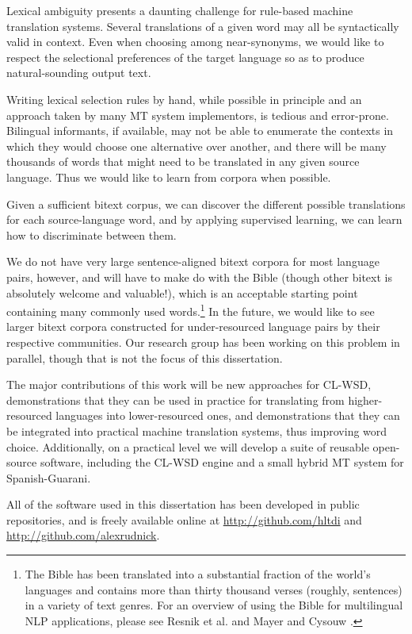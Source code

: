 Lexical ambiguity presents a daunting challenge for rule-based machine
translation systems. Several translations of a given word may all be
syntactically valid in context.
Even when choosing among near-synonyms, we would like to respect the
selectional preferences of the target language so as to produce
natural-sounding output text.

Writing lexical selection rules by hand, while possible in principle and an
approach taken by many MT system implementors, is tedious and error-prone.
Bilingual informants, if available, may not be able to enumerate the contexts
in which they would choose one alternative over another, and there will be many
thousands of words that might need to be translated in any given source
language. Thus we would like to learn from corpora when possible.

Given a sufficient bitext corpus, we can discover the different possible
translations for each source-language word, and by applying supervised
learning, we can learn how to discriminate between them.

We do not have very large sentence-aligned bitext corpora for most language
pairs, however, and will have to make do with the Bible (though other bitext is
absolutely welcome and valuable!), which is an acceptable
starting point containing many commonly used words.\footnote{The
Bible has been translated into a substantial fraction of the world's languages
and contains more than thirty thousand verses (roughly, sentences) in
a variety of text genres. For an overview of using the Bible for multilingual
NLP applications, please see Resnik et al.
\cite{DBLP:journals/lre/ResnikOD99} and Mayer and Cysouw
\cite{MAYER14.220.L14-1215}.} In the future, we would like to see larger
bitext corpora constructed for under-resourced language pairs by their
respective communities. Our research group has been working on this problem in
parallel, though that is not the focus of this dissertation.

The major contributions of this work will be new approaches for CL-WSD,
demonstrations that they can be used in practice for translating from
higher-resourced languages into lower-resourced ones, and demonstrations that
they can be integrated into practical machine translation systems, thus
improving word choice.
Additionally, on a practical level we will develop a suite of reusable 
open-source software, including the CL-WSD engine and a small hybrid MT system
for Spanish-Guarani.

All of the software used in this dissertation has been developed in public
repositories, and is freely available online at
\url{http://github.com/hltdi} and \url{http://github.com/alexrudnick}.

